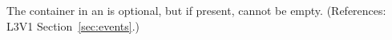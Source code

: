 The  container in an \Event is optional, but if present,
cannot be empty.  (References: L3V1 Section~\ref{sec:events}.)
